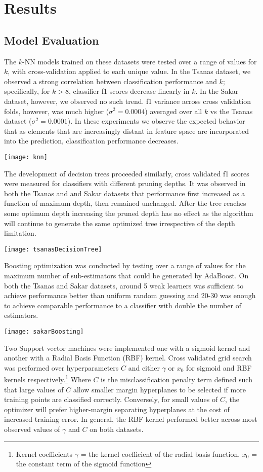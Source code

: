 \documentclass[12pt]{article}
\begin{document}
\section{Results}
\subsection{Model Evaluation}
The $k$-NN models trained on these datasets were tested over a range of values for $k$, with cross-validation applied to each unique value. In the Tsanas dataset, we observed a strong correlation between classification performance and $k$; specifically, for $k > 8$, classifier f1 scores decrease linearly in $k$. In the Sakar dataset, however, we observed no such trend. f1 variance across cross validation folds, however, was much higher ($\sigma^2=0.0004$) averaged over all $k$ vs the Tsanas dataset ($\sigma^2=0.0001$). In these experiments we observe the expected behavior that as elements that are increasingly distant in feature space are incorporated into the prediction, classification performance decreases.
\begin{center}
\texttt{[image: knn]}
\end{center}

The development of decision trees proceeded similarly, cross validated f1 scores were measured for classifiers with different pruning depths. It was observed in both the Tsanas and and Sakar datasets that performance first increased as a function of maximum depth, then remained unchanged. After the tree reaches some optimum depth increasing the pruned depth has no effect as the algorithm will continue to generate the same optimized tree irrespective of the depth limitation.
\begin{center}
\texttt{[image: tsanasDecisionTree]}
\end{center}
Boosting optimization was conducted by testing over a range of values for the maximum number of sub-estimators that could be generated by AdaBoost. On both the Tsanas and Sakar datasets, around 5 weak learners was sufficient to achieve performance better than uniform random guessing and 20-30 was enough to achieve comparable performance to a classifier with double the number of estimators.
\begin{center}
\texttt{[image: sakarBoosting]}
\end{center}

Two Support vector machines were implemented one with a sigmoid kernel and another with a Radial Basis Function (RBF) kernel. Cross validated grid search was performed over hyperparameters $C$ and either $\gamma$ or $x_0$ for sigmoid and RBF kernels respectively.\footnote{Kernel coefficients $\gamma$ = the kernel coefficient of the radial basis function. $x_0$ = the constant term of the sigmoid function} Where $C$ is the misclassification penalty term defined such that large values of $C$ allow smaller margin hyperplanes to be selected if more training points are classified correctly. Conversely, for small values of $C$, the optimizer will prefer higher-margin separating hyperplanes at the cost of increased training error. In general, the RBF kernel performed better across most observed values of $\gamma$ and $C$ on both datasets.
\end{document}
